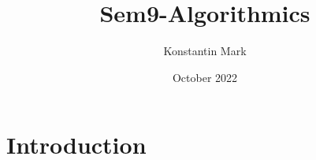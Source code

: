 \documentclass{article}
\title{Sem9-Algorithmics}
\author{Konstantin Mark}
\date{October 2022}
\begin{document}
\maketitle

\section{Introduction}
\end{document}
